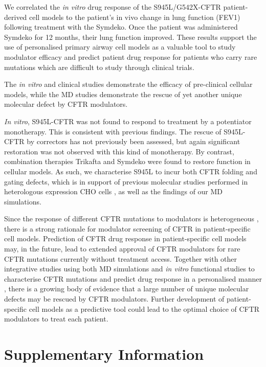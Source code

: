 We correlated the \textit{in vitro} drug response of the S945L/G542X-CFTR patient-derived cell models to the patient’s in vivo change in lung function (FEV1) following treatment with the Symdeko. Once the patient was administered Symdeko for 12 months, their lung function improved. These results support the use of personalised primary airway cell models as a valuable tool to study modulator efficacy and predict patient drug response for patients who carry rare mutations which are difficult to study through clinical trials. 

The \textit{in vitro} and clinical studies demonstrate the efficacy of pre-clinical cellular models, while the MD studies demonstrate the rescue of yet another unique molecular defect by CFTR modulators.  

\textit{In vitro}, S945L-CFTR was not found to respond to treatment by a potentiator monotherapy. This is consistent with previous findings. The rescue of S945L-CFTR by correctors has not previously been assessed, but again significant restoration was not observed with this kind of monotherapy. By contrast, combination therapies Trikafta and Symdeko were found to restore function in cellular models. As such, we characterise S945L to incur both CFTR folding and gating defects, which is in support of previous molecular studies performed in heterologous expression CHO cells \cite{seibert1996}, as well as the findings of our MD simulations.

Since the response of different CFTR mutations \cite{laselva2021} to modulators is heterogeneous \cite{wainwright2015,boyle2014}, there is a strong rationale for modulator screening of CFTR in patient-specific cell models. Prediction of CFTR drug response in patient-specific cell models may, in the future, lead to extended approval of CFTR modulators for rare CFTR mutations currently without treatment access. Together with other integrative studies using both MD simulations and \textit{in vitro} functional studies to characterise CFTR mutations and predict drug response in a personalised manner \cite{wong2022,wong2022a,billet2020,sabusap2021, sharma2015}, there is a growing body of evidence that a large number of unique molecular defects may be rescued by CFTR modulators. Further development of patient-specific cell models as a predictive tool could lead to the optimal choice of CFTR modulators to treat each patient.  

\section {Supplementary Information}
\renewcommand{\thefigure}{\arabic{chapter}.S\arabic{figure}}
\setcounter{figure}{0}

